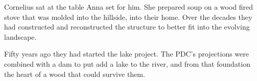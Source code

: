 Cornelius sat at the table Anna set for him.  She prepared soup on a
wood fired stove that was molded into the hillside, into their home.
Over the decades they had constructed and reconstructed the structure
to better fit into the evolving landscape.  

Fifty years ago they had started the lake project.  The PDC's projections
were combined with a dam to put add a lake to the river, and from that
foundation the heart of a wood that could survive them.


\bigskip



\bye
